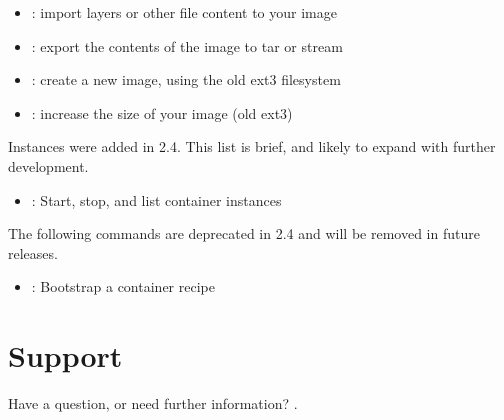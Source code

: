 \documentclass[letterpaper,10pt,english]{sphinxmanual}
\begin{document}
\begin{itemize}
\item {} 
 : import layers or other file content to your image

\item {} 
 : export the contents of the image to tar or stream

\item {} 
 : create a new image, using the old ext3 filesystem

\item {} 
 : increase the size of your image (old ext3)

\end{itemize}

\begin{DUlineblock}{0em}
\item[] 
\item[] Instances were added in 2.4. This list is brief, and likely to expand
with further development.
\end{DUlineblock}
\begin{itemize}
\item {} 
 : Start, stop, and list container instances

\end{itemize}

 The following commands are deprecated in 2.4 and
will be removed in future releases.
\begin{itemize}
\item {} 
 : Bootstrap a container recipe

\end{itemize}


\section{Support}
\label{\detokenize{introduction:support}}
Have a question, or need further information? .
\end{document}
